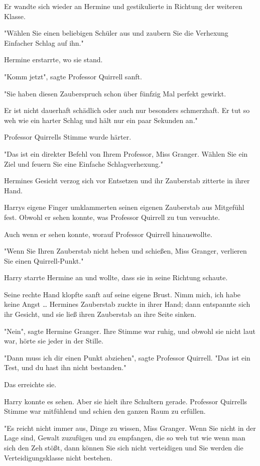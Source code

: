 {Er wandte sich wieder an Hermine und gestikulierte in Richtung der weiteren Klasse.

"Wählen Sie einen beliebigen Schüler aus und zaubern Sie die Verhexung Einfacher Schlag auf ihn."

Hermine erstarrte, wo sie stand.

"Komm jetzt", sagte Professor Quirrell sanft.

"Sie haben diesen Zauberspruch schon über fünfzig Mal perfekt gewirkt.

Er ist nicht dauerhaft schädlich oder auch nur besonders schmerzhaft. Er tut so weh wie ein harter Schlag und hält nur ein paar Sekunden an."

Professor Quirrells Stimme wurde härter.

"Das ist ein direkter Befehl von Ihrem Professor, Miss Granger. Wählen Sie ein Ziel und feuern Sie eine Einfache Schlagverhexung."

Hermines Gesicht verzog sich vor Entsetzen und ihr Zauberstab zitterte in ihrer Hand.

Harrys eigene Finger umklammerten seinen eigenen Zauberstab aus Mitgefühl fest. Obwohl er sehen konnte, was Professor Quirrell zu tun versuchte.

Auch wenn er sehen konnte, worauf Professor Quirrell hinauswollte.

"Wenn Sie Ihren Zauberstab nicht heben und schießen, Miss Granger, verlieren Sie einen Quirrell-Punkt."

Harry starrte Hermine an und wollte, dass sie in seine Richtung schaute.

Seine rechte Hand klopfte sanft auf seine eigene Brust. Nimm mich, ich habe keine Angst … Hermines Zauberstab zuckte in ihrer Hand; dann entspannte sich ihr Gesicht, und sie ließ ihren Zauberstab an ihre Seite sinken.

"Nein", sagte Hermine Granger. Ihre Stimme war ruhig, und obwohl sie nicht laut war, hörte sie jeder in der Stille.

"Dann muss ich dir einen Punkt abziehen", sagte Professor Quirrell. "Das ist ein Test, und du hast ihn nicht bestanden."

Das erreichte sie.

Harry konnte es sehen. Aber sie hielt ihre Schultern gerade. Professor Quirrells Stimme war mitfühlend und schien den ganzen Raum zu erfüllen.

"Es reicht nicht immer aus, Dinge zu wissen, Miss Granger. Wenn Sie nicht in der Lage sind, Gewalt zuzufügen und zu empfangen, die so weh tut wie wenn man sich den Zeh stößt, dann können Sie sich nicht verteidigen und Sie werden die Verteidigungsklasse nicht bestehen.

}
